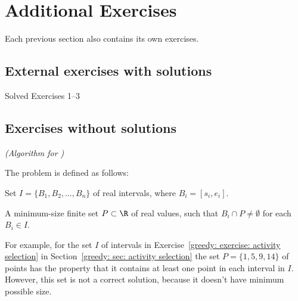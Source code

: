 
\section{Additional Exercises}\label{greedy: sec: exercises}

Each previous section also contains its own exercises.

\subsection{External exercises with solutions}


\begin{mylist}[-]
\item \KT Solved Exercises 1--3
\end{mylist}

\subsection{Exercises without solutions}

\exercise\label{greedy: exercise: puncturing intervals example}\emph{(Algorithm for )}

The  problem is defined as follows: 

\begin{mylist}
\item[\bf input:] Set $I=\{B_1, B_2, \ldots, B_n\}$ of real intervals, where $B_i = [s_i, e_i]$.
\item[\bf output:] A minimum-size finite set $P\subset \R$ of real values,
  such that $B_i \cap P \ne \emptyset$ for each $B_i\in I$.
\end{mylist}


For example, for the set $I$ of intervals in Exercise~\ref{greedy: exercise: activity selection}
in Section~\ref{greedy: sec: activity selection}
the set $P=\{1, 5, 9, 14\}$ of points has the property that
it contains at least one point in each interval in $I$.
However, this set is not a correct solution, because it doesn't have minimum possible size.

